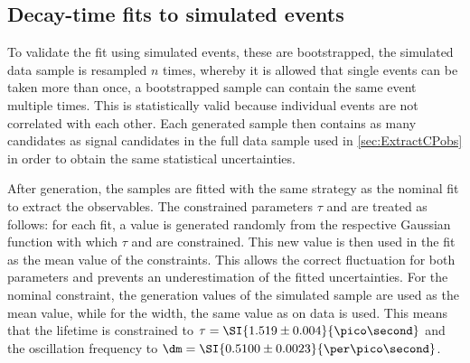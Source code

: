 \subsection{Decay-time fits to simulated events}
\label{sec:valOnSim}

To validate the fit using simulated events, these are bootstrapped, \ie the simulated data sample is resampled $n$ times, whereby it is allowed that single events can be taken more than once, \eg a bootstrapped sample can contain the same event multiple times.
This is statistically valid because individual events are not correlated with each other.
Each generated sample then contains as many candidates as signal candidates in the full \BdToDpi data sample used in \cref{sec:ExtractCPobs} in order to obtain the same statistical uncertainties.

After generation, the samples are fitted with the same strategy as the nominal fit to extract the \CP observables.
The constrained parameters $\tau$ and \dm are treated as follows:
for each fit, a value is generated randomly from the respective Gaussian function with which $\tau$ and \dm are constrained.
This new value is then used in the fit as the mean value of the constraints.
This allows the correct fluctuation for both parameters and prevents an underestimation of the fitted uncertainties.
For the nominal constraint, the generation values of the simulated sample are used as the mean value, while for the width, the same value as on data is used.
This means that the lifetime is constrained to $\tau=\SI{1.519\pm0.004}{\pico\second}$ and the oscillation frequency to $\dm=\SI{0.5100\pm0.0023}{\per\pico\second}$.

